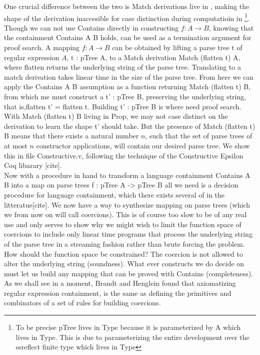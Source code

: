 \documentclass[a4paper,UKenglish,cleveref, autoref, thm-restate]{lipics-v2021}
\begin{document}
One crucial difference between the two is \textsf{Match} derivations live in \prop, making the shape of the derivation inaccesible for case distinction during computatioin in \myset \footnote{To be precise pTree lives in Type because it is parameterized by A which lives in Type. This is due to parameterizing the entire development over the ssreflect finite type which lives in Type }. Though we can not use \textsf{Contains} directly in constructing $f : A \rightarrow B$, knowing that the containment \textsf{Contains A B} holds, can be used as a termination argument for proof search. A mapping $f : A \rightarrow B$ can be obtained by lifting a parse tree \textsf{t} of regular expression $A$, \textsf{t : pTree A}, to a Match derivation \textsf{Match (flatten t) A}, where \textsf{flatten} returns the underlying string of the parse tree. Translating to a match derivation takes linear time in the size of the parse tree. From here we can apply the \textsf{Contains A B} assumption as a function returning \textsf{Match (flatten t) B}, from which me must construct a \textsf{t' : pTree B}, preserving the underlying string, that is,\textsf{flatten t' = flatten t}. Building \textsf{t' : pTree B} is where need proof search. With \textsf{Match (flatten t) B} living in Prop, we may not case distinct on the derivation to learn the shape \textsf{t'} should take. But the presence of \textsf{Match (flatten t) B} means that there exists a natural number $n$, such that the set of parse trees of at most $n$ constructor applications, will contain our desired parse tree. We show this in file \textsf{Constructive.v}, following the technique of the Constructive Epsilon Coq libarary [cite].\\
Now with a procedure in hand to transform a language containment \textsf{Contains A B} into a map on parse trees \textsf{f : pTree A -> pTree B} all we need is a decision procedure for language containment, which there exists several of in the litteratue[cite]. We now have a way to synthesize mapping on parse trees (which we from now on will call coercions). This is of course too slow to be of any real use and only serves to show why we might wish to limit the function space of coercions to include only linear time programs that process the underlying string of the parse tree in a streaming fashion rather than brute forcing the problem. How should the function space be constrained? The coercion is not allowed to alter the underlying string (soundness). What ever constructs we do decide on must let us build any mapping that can be proved with \textsf{Contains} (completeness). As we shall see in a moment, Brandt and Henglein found that axiomatizing regular expression containment, is the same as defining the primitives and combinators of a set of rules for building coercions.
\end{document}
